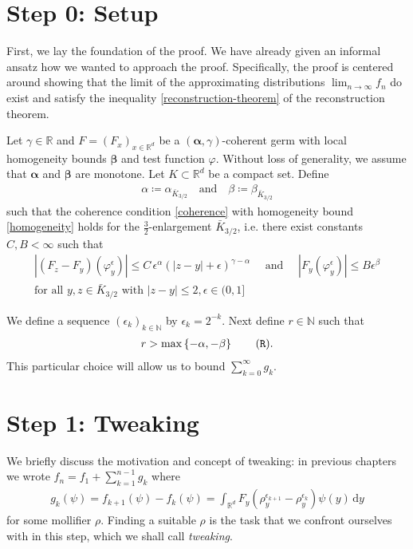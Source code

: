 \section{Step 0: Setup}\label{setup} First, we lay the foundation of the proof. We have already given an informal ansatz how we wanted to approach the proof. Specifically, the proof is centered around showing that the limit of the approximating distributions $\lim_{n \to \infty} f_n$ do exist and satisfy the inequality \eqref{reconstruction-theorem} of the reconstruction theorem.

Let $\gamma \in \mathbb{R}$ and $F = (F_x)_{x \in \mathbb{R}^d}$ be a $(\bm \alpha, \gamma)$-coherent germ with local homogeneity bounds $\bm \beta$ and test function $\varphi$. Without loss of generality, we assume that $\bm \alpha$ and $\bm \beta$ are monotone. Let $K \subset \mathbb{R}^d$ be a compact set. Define 
\begin{align*}
    \alpha \coloneqq \alpha_{\bar K_{3/2}} \quad \text{and} \quad  \beta \coloneqq \beta_{\bar K_{3/2}}
\end{align*}
 such that the coherence condition \eqref{coherence} with homogeneity bound \eqref{homogeneity} holds for the $\frac{3}{2}$-enlargement $\bar K_{3/2}$, i.e. there exist constants $C,B < \infty$ such that
\begin{gather}\label{starter-coherence}
    |(F_z - F_y)(\varphi^\epsilon_y)| \leq C \, \epsilon^\alpha(|z-y| + \epsilon)^{\gamma - \alpha} \quad \text{ and } \quad
    |F_y(\varphi^\epsilon_y)| \leq B \epsilon^\beta \\
    \text{for all } y,z \in \bar K_{3/2} \text{ with } |z-y| \leq 2,  \epsilon \in (0,1] \nonumber
\end{gather}

We define a sequence $(\epsilon_k)_{k \in \mathbb{N}}$ by $\epsilon_k = 2^{-k}$. Next define $r \in \mathbb{N}$ such that
\begin{align}\label{setup:r}
    r > \max\left\{ -\alpha, -\beta \right\} \tag{\texttt{R}}.
\end{align}
This particular choice will allow us to bound $\sum^\infty_{k=0} g_k$. 

\section{Step 1: Tweaking}\label{chapter:step-1-tweaking}

We briefly discuss the motivation and concept of tweaking: in previous chapters we wrote $f_n = f_1 + \sum^{n-1}_{k=1}g_k$ where
\begin{align*}
    g_k(\psi) = f_{k+1}(\psi) - f_k(\psi) = \int_{\mathbb{R}^d} F_y(\rho_y^{\epsilon_{k+1}} - \rho_y^{\epsilon_k}) \psi(y)\, \mathrm{d}y
\end{align*} 
for some mollifier $\rho$. Finding a suitable $\rho$ is the task that we confront ourselves with in this step, which we shall call \emph{tweaking}. 

